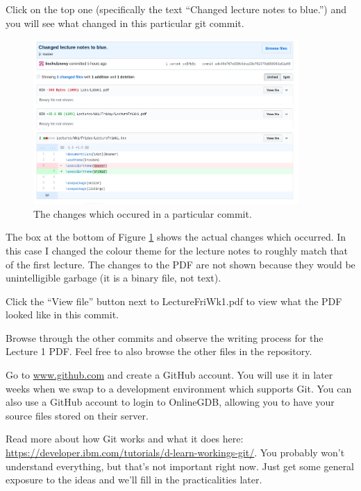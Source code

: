 \documentclass{lab}
\begin{document}
Click on the top one (specifically the text ``Changed lecture notes to blue.'') and you will see what changed in this particular git commit.

\begin{figure}[H]
\begin{center}
\includegraphics[width=0.9\textwidth]{Wk1Images/github_lecture_changes.png}
\end{center}
\caption{The changes which occured in a particular commit.}\label{fig:gitchanges}
\end{figure}

The box at the bottom of Figure \ref{fig:gitchanges} shows the actual changes which occurred. In this case I changed the colour theme for the lecture notes to roughly match that of the first lecture. The changes to the PDF are not shown because they would be unintelligible garbage (it is a binary file, not text).

Click the ``View file'' button next to LectureFriWk1.pdf to view what the PDF looked like in this commit.

Browse through the other commits and observe the writing process for the Lecture 1 PDF. Feel free to also browse the other files in the repository.

\begin{task}{}{} Go to \url{www.github.com} and create a GitHub account. You will use it in later weeks when we swap to a development environment which supports Git. You can also use a GitHub account to login to OnlineGDB, allowing you to have your source files stored on their server.
\end{task}

\begin{task}{}{} Read more about how Git works and what it does here: \url{https://developer.ibm.com/tutorials/d-learn-workings-git/}. You probably won't understand everything, but that's not important right now. Just get some general exposure to the ideas and we'll fill in the practicalities later.
\end{task}
\end{document}
